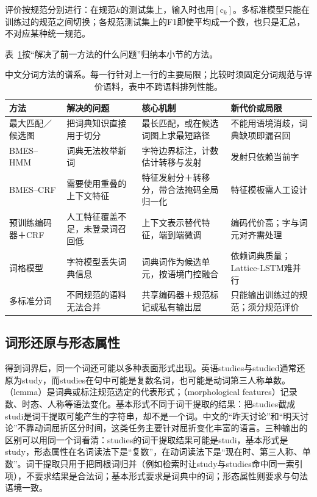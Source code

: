 评价按规范分别进行：在规范$k$的测试集上，输入时也用$[\mathrm c_k]$。多标准模型只能在训练过的规范之间切换；各规范测试集上的F1即使平均成一个数，也只是汇总，不对应某种统一规范。

表~\ref{tab:nlp-analysis-segmentation-methods}按“解决了前一方法的什么问题”归纳本小节的方法。

\begin{table}[htbp]
  \centering
  \begin{tabularx}{\linewidth}{@{}>{\raggedright\arraybackslash}p{24mm}>{\raggedright\arraybackslash}p{36mm}XX@{}}
    \toprule
    方法&解决的问题&核心机制&新代价或局限\\
    \midrule
    最大匹配／候选图&把词典知识直接用于切分&最长匹配，或在候选词图上求最短路径&不能用语境消歧，词典缺项即漏召回\\
    BMES--HMM&词典无法枚举新词&字符边界标注，计数估计转移与发射&发射只依赖当前字\\
    BMES--CRF&需要使用重叠的上下文特征&特征发射分＋转移分，带合法掩码全局归一化&特征模板需人工设计\\
    预训练编码器＋CRF&人工特征覆盖不足，未登录词召回低&上下文表示替代特征，端到端微调&编码代价高；字与词元对齐需处理\\
    词格模型&字符模型丢失词典信息&词典词作为候选单元，按语境门控融合&依赖词典质量；Lattice-LSTM难并行\\
    多标准分词&不同规范的语料无法合并&共享编码器＋规范标记或私有输出层&只能输出训练过的规范；须分规范评价\\
    \bottomrule
  \end{tabularx}
  \caption{中文分词方法的谱系。每一行针对上一行的主要局限；比较时须固定分词规范与评价语料，表中不跨语料排列性能。}
  \label{tab:nlp-analysis-segmentation-methods}
\end{table}

\subsection{词形还原与形态属性}
\label{sec:nlp-analysis-morphology}

得到词界后，同一个词还可能以多种表面形式出现。英语studies与studied通常还原为study，而studies在句中可能是复数名词，也可能是动词第三人称单数。（lemma）是词典或标注规范选定的代表形式；（morphological features）记录数、时态、人称等语法变化。基本形式不同于词干提取的结果：把studies截成studi是词干提取可能产生的字符串，却不是一个词。中文的“昨天讨论”和“明天讨论”不靠动词屈折区分时间，这类任务主要针对屈折变化丰富的语言。三种输出的区别可以用同一个词看清：studies的词干提取结果可能是studi，基本形式是study，形态属性在名词读法下是“复数”，在动词读法下是“现在时、第三人称、单数”。词干提取只用于把同根词归并（例如检索时让study与studies命中同一索引项），不要求结果是合法词；基本形式要求是词典中的词；形态属性则要求与句法语境一致。


